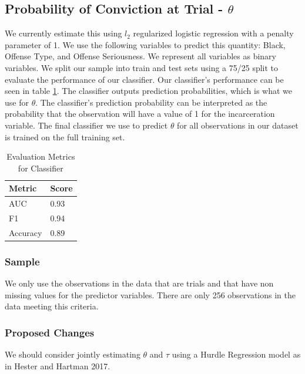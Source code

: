 \documentclass[11pt]{article}
\theoremstyle{ModifiedStyle}
\theoremstyle{ModifiedStyle}
\begin{document}
  \subsection{Probability of Conviction at Trial - $\theta$}
    We currently estimate this using $l_2$ regularized logistic regression with a penalty parameter of 1. We use the following variables to predict this quantity: Black, Offense Type, and Offense Seriousness. We represent all variables as binary variables. We split our sample into train and test sets using a 75/25 split to evaluate the performance of our classifier. Our classifier's performance can be seen in table \ref{classifier-performance}. The classifier outputs prediction probabilities, which is what we use for $\theta$. The classifier's prediction probability can be interpreted as the probability that the observation will have a value of 1 for the incarceration variable. The final classifier we use to predict $\theta$ for all observations in our dataset is trained on the full training set.

    \begin{table}[H]
      \centering
      \caption{Evaluation Metrics for Classifier}
      \label{classifier-performance}
      \begin{tabular}{|l|l|}
      \hline
      \textbf{Metric} & \textbf{Score} \\ \hline
      AUC             & 0.93           \\ \hline
      F1              & 0.94           \\ \hline
      Accuracy        & 0.89           \\ \hline
      \end{tabular}
    \end{table}

    \subsubsection{Sample}
      We only use the observations in the data that are trials and that have non missing values for the predictor variables. There are only 256 observations in the data meeting this criteria.

    \subsubsection{Proposed Changes}
      We should consider jointly estimating $\theta$ and $\tau$ using a Hurdle Regression model as in Hester and Hartman 2017.
\end{document}
